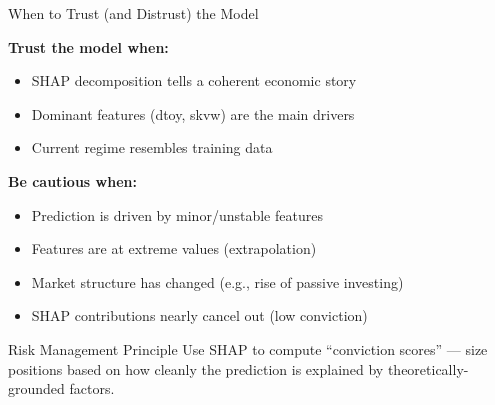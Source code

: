 \documentclass[10pt]{beamer}
\begin{document}
\begin{frame}{When to Trust (and Distrust) the Model}

  \textbf{Trust the model when:}
  \begin{itemize}
    \item SHAP decomposition tells a coherent economic story
    \item Dominant features (dtoy, skvw) are the main drivers
    \item Current regime resembles training data
  \end{itemize}

  \vspace{0.5em}
  \textbf{Be cautious when:}
  \begin{itemize}
    \item Prediction is driven by minor/unstable features
    \item Features are at extreme values (extrapolation)
    \item Market structure has changed (e.g., rise of passive investing)
    \item SHAP contributions nearly cancel out (low conviction)
  \end{itemize}

  \vspace{0.5em}
  \begin{block}{Risk Management Principle}
    Use SHAP to compute ``conviction scores'' --- size positions based on how cleanly the prediction is explained by theoretically-grounded factors.
  \end{block}
\end{frame}

\end{document}
